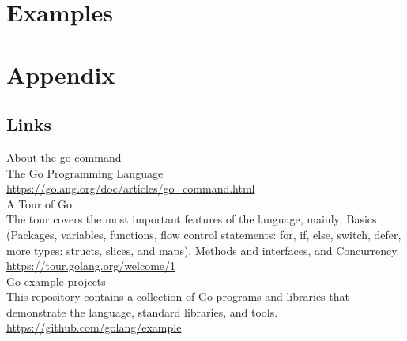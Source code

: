 \documentclass[12pt,letterpaper,dvips]{article}
\begin{document}
\newpage
\section{Examples}


\setcounter{secnumdepth}{0}
\section{Appendix}


\subsection{Links}

About the go command\\
The Go Programming Language\\
\href{https://golang.org/doc/articles/go\_command.html}{https://golang.org/doc/articles/go\_command.html}
\\

\noindent A Tour of Go\\
The tour covers the most important features of the language,
mainly: Basics (Packages, variables, functions, flow control
statements: for, if, else, switch, defer, more types:
structs, slices, and maps), Methods and interfaces, and
Concurrency.\\
\href{https://tour.golang.org/welcome/}{https://tour.golang.org/welcome/1}
\\

\noindent Go example projects\\
This repository contains a collection of Go programs
and libraries that demonstrate the language,
standard libraries, and tools.\\
\href{https://github.com/golang/example}{https://github.com/golang/example}
\\
\end{document}
